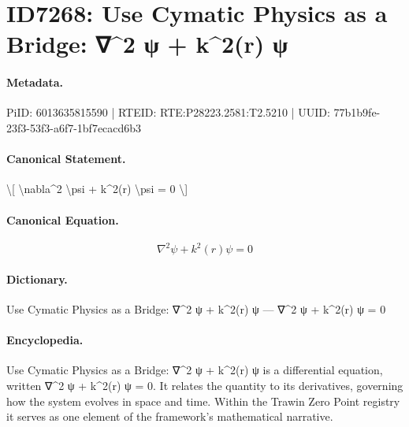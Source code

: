 \section*{ID7268: Use Cymatic Physics as a Bridge: ∇\textasciicircum{}2 ψ + k\textasciicircum{}2(r) ψ}
\paragraph{Metadata.}
PiID: 6013635815590 | RTEID: RTE:P28223.2581:T2.5210 | UUID: 77b1b9fe-23f3-53f3-a6f7-1bf7ecacd6b3

\paragraph{Canonical Statement.}
\textbackslash{}[ \textbackslash{}nabla\textasciicircum{}2 \textbackslash{}psi + k\textasciicircum{}2(r) \textbackslash{}psi = 0 \textbackslash{}]

\paragraph{Canonical Equation.}
\[
\nabla^2 \psi + k^2(r) \psi = 0
\]

\paragraph{Dictionary.}
Use Cymatic Physics as a Bridge: ∇\textasciicircum{}2 ψ + k\textasciicircum{}2(r) ψ — ∇\textasciicircum{}2 ψ + k\textasciicircum{}2(r) ψ = 0

\paragraph{Encyclopedia.}
Use Cymatic Physics as a Bridge: ∇\textasciicircum{}2 ψ + k\textasciicircum{}2(r) ψ is a differential equation, written ∇\textasciicircum{}2 ψ + k\textasciicircum{}2(r) ψ = 0. It relates the quantity to its derivatives, governing how the system evolves in space and time. Within the Trawin Zero Point registry it serves as one element of the framework's mathematical narrative.
